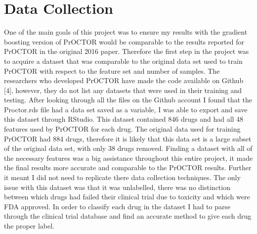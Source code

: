\documentclass[12pt]{article}
\begin{document}
\section{Data Collection}
One of the main goals of this project was to ensure my results with the gradient boosting version of PrOCTOR would be comparable to the results reported for PrOCTOR in the original 2016 paper. Therefore the first step in the project was to acquire a dataset that was comparable to the original data set used to train PrOCTOR with respect to the feature set and number of samples. The researchers who developed PrOCTOR have made the code available on Github [4], however, they do not list any datasets that were used in their training and testing. After looking through all the files on the Github account I found that the Proctor.rds file had a data set saved as a variable, I was able to export and save this dataset through RStudio. This dataset contained 846 drugs and had all 48 features used by PrOCTOR for each drug. The original data used for training PrOCTOR had 884 drugs, therefore it is likely that this data set is a large subset of the original data set, with only 38 drugs removed. Finding a dataset with all of the necessary features was a big assistance throughout this entire project, it made the final results more accurate and comparable to the PrOCTOR results. Further it meant I did not need to replicate there data collection techniques. The only issue with this dataset was that it was unlabelled, there was no distinction between which drugs had failed their clinical trial due to toxicity and which were FDA approved. In order to classify each drug in the dataset I had to parse through the clinical trial database and find an accurate method to give each drug the proper label. \\
\end{document}
